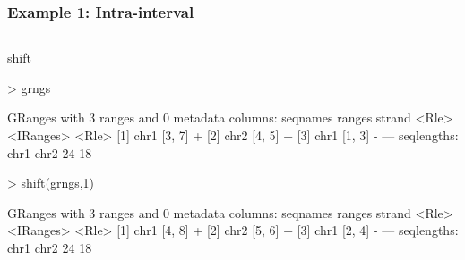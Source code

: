 \documentclass{beamer}
\begin{document}

\begin{frame}[fragile]
\frametitle{Example 1: Intra-interval}
\begin{columns}

\begin{column}{0.45\textwidth}
  \bit
      \item shift
           \begin{uncoverenv}
\begin{Schunk}
\begin{Sinput}
> grngs
\end{Sinput}
\begin{Soutput}
GRanges with 3 ranges and 0 metadata columns:
      seqnames    ranges strand
         <Rle> <IRanges>  <Rle>
  [1]     chr1    [3, 7]      +
  [2]     chr2    [4, 5]      +
  [3]     chr1    [1, 3]      -
  ---
  seqlengths:
   chr1 chr2
     24   18
\end{Soutput}
\begin{Sinput}
> shift(grngs,1)
\end{Sinput}
\begin{Soutput}
GRanges with 3 ranges and 0 metadata columns:
      seqnames    ranges strand
         <Rle> <IRanges>  <Rle>
  [1]     chr1    [4, 8]      +
  [2]     chr2    [5, 6]      +
  [3]     chr1    [2, 4]      -
  ---
  seqlengths:
   chr1 chr2
     24   18
\end{Soutput}
\end{Schunk}
        \end{uncoverenv}  
  \eit
  \end{column}
  

\end{columns}
\end{frame}
\end{document}
